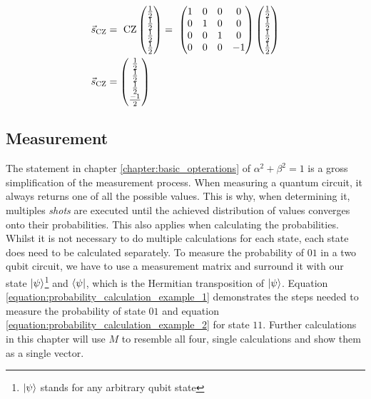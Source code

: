 \begin{equation}
    \centering
    \begin{split}
        \vec{s}_{\mathrm{CZ}} &=\ \mathrm{CZ}\begin{pmatrix}
            \frac{1}{2}\\\frac{1}{2}\\\frac{1}{2}\\\frac{1}{2}
        \end{pmatrix} =\  \begin{pmatrix}
        1 & 0 & 0 & 0 \\
        0 & 1 & 0 & 0 \\
        0 & 0 & 1 & 0 \\
        0 & 0 & 0 & -1
    \end{pmatrix}\begin{pmatrix}
            \frac{1}{2}\\\frac{1}{2}\\\frac{1}{2}\\\frac{1}{2}
        \end{pmatrix} \\
        \vec{s}_{\mathrm{CZ}} &= \begin{pmatrix}
            \frac{1}{2}\\\frac{1}{2}\\\frac{1}{2}\\\frac{-1}{2}
        \end{pmatrix}
    \end{split}
    \label{equation:cz_entanglement}
\end{equation}

\subsection{Measurement}
\label{chapter:measurement}
The statement in chapter \ref{chapter:basic_opterations} of $\alpha^2 + \beta^2 = 1$ is a gross simplification of the  measurement process. When measuring a quantum circuit, it always returns one of all the possible values. This is why, when determining it, multiples \emph{shots} are executed until the achieved distribution of values converges onto their probabilities. This also applies when calculating the probabilities. Whilst it is not necessary to do multiple calculations for each state, each state does need to be calculated separately. To measure the probability of $01$ in a two qubit circuit, we have to use a measurement matrix and surround it with our state $\ket{\psi}$\footnote{$\ket{\psi}$ stands for any arbitrary qubit state} and $\bra{\psi}$, which is the Hermitian transposition\cite{marshall_c_methods_1964} of $\ket{\psi}$. Equation \ref{equation:probability_calculation_example_1} demonstrates the steps needed to measure the probability of state $01$ and equation \ref{equation:probability_calculation_example_2} for state $11$. Further calculations in this chapter will use $M$ to resemble all four, single calculations and show them as a single vector.

